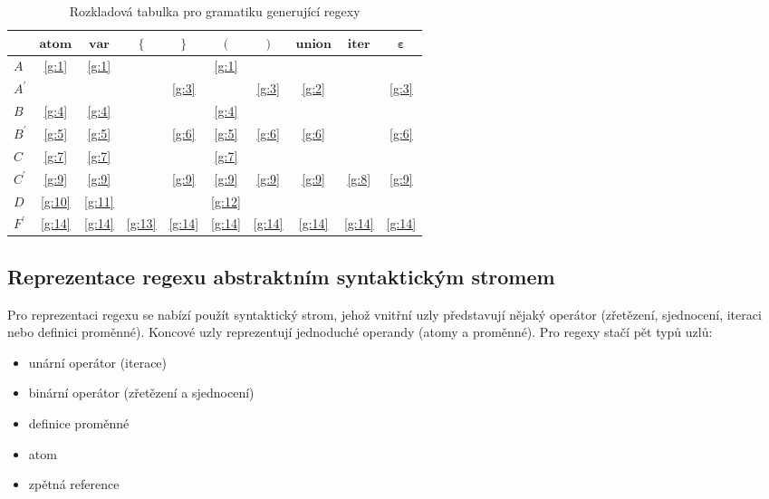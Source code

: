 \documentclass[thesis=B,czech]{FITthesis}[2019/12/23]
\theoremstyle{definition}
\begin{document}
\begin{table}
\begin{center}
 \begin{tabular}{|l|c c c c c c c c c|} 
 \hline
  &  $\mathbf{atom}$ & $\mathbf{var}$ & $\mathbf{\{}$ & $\mathbf{\}}$ & $\mathbf{(}$ & $\mathbf{)}$ & $\mathbf{union}$ & $\mathbf{iter}$ & $\mathbf{\varepsilon}$  \\ [0.5ex] 
 \hline\hline
$A$ & \ref{g:1} & \ref{g:1} & & & \ref{g:1} & & & &  \\
\hline
$A^\prime$ & & & &\ref{g:3} & & \ref{g:3} & \ref{g:2} & &\ref{g:3} \\
\hline 
$B$ & \ref{g:4} & \ref{g:4} & & & \ref{g:4} & & & &  \\
\hline
$B^\prime$ & \ref{g:5} &  \ref{g:5}  & &\ref{g:6} &  \ref{g:5} & \ref{g:6} & \ref{g:6} & &\ref{g:6} \\
\hline 
$C$ & \ref{g:7} & \ref{g:7} & & & \ref{g:7} & & & &  \\
\hline
$C^\prime$ & \ref{g:9} &  \ref{g:9}  & &\ref{g:9} & \ref{g:9} & \ref{g:9} & \ref{g:9} & \ref{g:8} &\ref{g:9} \\
\hline 
$D$ & \ref{g:10} & \ref{g:11} & & & \ref{g:12} & & & &  \\
\hline
$F^\prime$ & \ref{g:14} &  \ref{g:14}  & \ref{g:13} &\ref{g:14} & \ref{g:14} & \ref{g:14} & \ref{g:14} & \ref{g:14} &\ref{g:14} \\
\hline
\end{tabular}
\end{center}
\caption{\label{tab:rozk} Rozkladová tabulka pro gramatiku generující regexy}
\end{table}

\subsection{Reprezentace regexu abstraktním syntaktickým stromem}
Pro reprezentaci regexu se nabízí použít syntaktický strom, jehož vnitřní uzly představují nějaký operátor (zřetězení, sjednocení, iteraci nebo definici proměnné). Koncové uzly reprezentují jednoduché operandy (atomy a proměnné). Pro regexy stačí pět typů uzlů:
\begin{itemize}
\item unární operátor (iterace)
\item binární operátor (zřetězení a sjednocení)
\item definice proměnné
\item atom
\item zpětná reference
\end{itemize}
\end{document}
